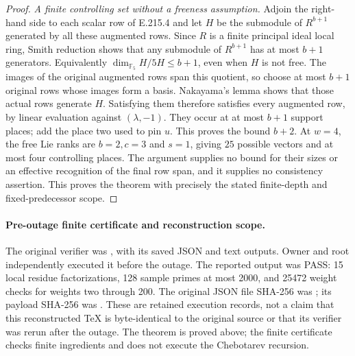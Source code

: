 \begin{proof}
\emph{A finite controlling set without a freeness assumption.}
Adjoin the right-hand side to each scalar row of E.215.4 and let $H$ be
the submodule of $R^{b+1}$ generated by all these augmented rows.
Since $R$ is a finite principal ideal local ring, Smith reduction shows
that any submodule of $R^{b+1}$ has at most $b+1$ generators. Equivalently
$\dim_{\mathbb F_5}H/5H\le b+1$, even when $H$ is not free. The images
of the original augmented rows span this quotient, so choose at most
$b+1$ original rows whose images form a basis. Nakayama's lemma shows
that those actual rows generate $H$. Satisfying them therefore satisfies
every augmented row, by linear evaluation against $(\lambda,-1)$.
They occur at at most $b+1$ support places; add the place two used to
pin $u$. This proves the bound $b+2$. At $w=4$, the free Lie ranks are
$b=2,c=3$ and $s=1$, giving $25$ possible vectors and at most four
controlling places. The argument supplies no bound for their sizes or
an effective recognition of the final row span, and it supplies no
consistency assertion. This proves the theorem with precisely the
stated finite-depth and fixed-predecessor scope.
\end{proof}

\paragraph{Pre-outage finite certificate and reconstruction scope.}
The original verifier was , with
its saved JSON and text outputs. Owner and root independently executed
it before the outage. The reported output was PASS: 15 local residue
factorizations, 128 sample primes at most 2000, and 25472 weight checks
for weights two through 200. The original JSON file SHA-256 was
;
its payload SHA-256 was
.
These are retained execution records, not a claim that this reconstructed
TeX is byte-identical to the original source or that its verifier was
rerun after the outage. The theorem is proved above; the finite certificate
checks finite ingredients and does not execute the Chebotarev recursion.
